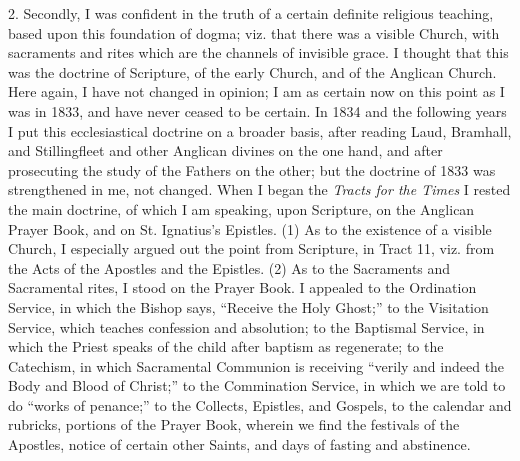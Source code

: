 2. Secondly, I was confident in the truth of a certain definite
religious teaching, based upon this foundation of dogma; viz. that there
was a visible Church, with sacraments and rites which are the
channels of invisible grace. I thought that this was the doctrine of
Scripture, of the early Church, and of the Anglican Church. Here again,
I have not changed in opinion; I am as certain now on this point as I
was in 1833, and have never ceased to be certain. In 1834 and the
following years I put this ecclesiastical doctrine on a broader basis,
after reading Laud, Bramhall, and Stillingfleet and other Anglican
divines on the one hand, and after prosecuting the study of the Fathers
on the other; but the doctrine of 1833 was strengthened in me, not
changed. When I began the \emph{Tracts for the Times} I rested the main
doctrine, of which I am speaking, upon Scripture, on the Anglican
Prayer Book, and on St. Ignatius's Epistles. (1) As to the existence of a visible Church, I
especially argued out the point from Scripture, in Tract 11, viz. from
the Acts of the Apostles and the Epistles. (2) As to the
Sacraments and Sacramental rites, I stood on the Prayer Book. I appealed
to the Ordination Service, in which the Bishop says, ``Receive the
Holy Ghost;'' to the Visitation Service, which teaches confession
and absolution; to the Baptismal Service, in which the Priest speaks of
the child after baptism as regenerate; to the Catechism, in which
Sacramental Communion is receiving ``verily and indeed the
Body and Blood of Christ;'' to the Commination Service, in which we
are told to do ``works of penance;'' to the Collects, Epistles,
and Gospels, to the calendar and rubricks, portions of the Prayer
Book, wherein we find the festivals of the Apostles, notice of
certain other Saints, and days of fasting and abstinence.

